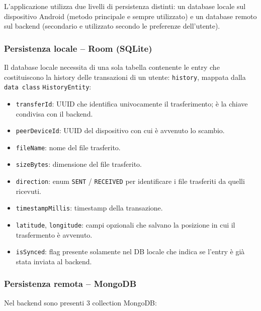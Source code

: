 L'applicazione utilizza due livelli di persistenza distinti: un database locale sul dispositivo Android (metodo principale e sempre utilizzato) e un database remoto sul backend (secondario e utilizzato secondo le preferenze dell'utente).

\subsubsection*{Persistenza locale -- Room (SQLite)}

Il database locale necessita di una sola tabella contenente le entry che costituiscono la history delle transazioni di un utente: \texttt{history}, mappata dalla \texttt{data class} \texttt{HistoryEntity}:

\begin{itemize}[label={--}, leftmargin=1.2cm]
    \item \texttt{transferId}: UUID che identifica univocamente il trasferimento; è la chiave condivisa con il backend.
    \item \texttt{peerDeviceId}: UUID del dispositivo con cui è avvenuto lo scambio.
    \item \texttt{fileName}: nome del file trasferito.
    \item \texttt{sizeBytes}: dimensione del file trasferito.
    \item \texttt{direction}: enum \texttt{SENT} / \texttt{RECEIVED} per identificare i file trasferiti da quelli ricevuti.
    \item \texttt{timestampMillis}: timestamp della transazione.
    \item \texttt{latitude}, \texttt{longitude}: campi opzionali che salvano la posizione in cui il trasfermento è avvenuto.
    \item \texttt{isSynced}: flag presente solamente nel DB locale che indica se l'entry è già stata inviata al backend.
\end{itemize}

\subsubsection*{Persistenza remota -- MongoDB}

Nel backend sono presenti 3 collection MongoDB:

